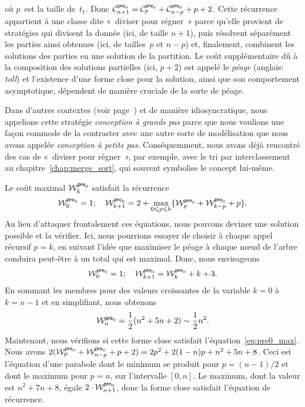 où \(p\)~est la taille de~\(t_1\). Donc \(\C{\fun{pre}_0}{n+1} =
\C{\fun{pre}_0}{p} + \C{\fun{pre}_0}{n-p} + p + 2\). Cette récurrence
appartient à une classe dite «~diviser pour
régner~» parce qu'elle provient de
stratégies qui divisent la donnée (ici, de taille \(n+1\)), puis
résolvent séparément les parties ainsi obtenues (ici, de tailles~\(p\)
et \(n-p\)) et, finalement, combinent les solutions des parties en une
solution de la partition. Le coût supplémentaire dû à la composition
des solutions partielles (ici, \(p+2\)) est appelé le
\emph{péage} (anglais: \emph{toll}) et l'existence d'une
forme close pour la solution, ainsi que son comportement asymptotique,
dépendent de manière cruciale de la sorte de péage.

Dans d'autres contextes (voir page~\pageref{big-step}) et de manière
idiosyncratique, nous appelions cette stratégie \emph{conception à
  grands pas} parce que nous voulions une
façon commode de la contraster avec une autre sorte de modélisation
que nous avons appelée \emph{conception à petits
  pas}. Conséquemment, nous avons déjà
rencontré des cas de «~diviser pour régner~», par exemple, avec le tri
par interclassement au
chapitre~\vref{chap:merge_sort}, qui souvent symbolise le concept
lui-même.

Le coût maximal
\(\W{\fun{pre}_0}{k}\) satisfait la
récurrence
\begin{equation}
\W{\fun{pre}_0}{0} = 1;\quad
\W{\fun{pre}_0}{k+1} =
  2 + \max_{0 \leqslant p \leqslant k}\{\W{\fun{pre}_0}{p}
                                  + \W{\fun{pre}_0}{k-p} + p\}.
\index{pre0@$\W{\fun{pre}_0}{n}$}
\label{eq:pre0_max}
\end{equation}
Au lieu d'attaquer frontalement ces équations, nous pouvons deviner
une solution possible et la vérifier. Ici, nous pourrions essayer de
choisir à chaque appel récursif \(p=k\), en suivant l'idée que
maximiser le péage à chaque nœud de l'arbre conduira peut-être à
un total qui est maximal. Donc, nous envisageons
\begin{equation}
\W{\fun{pre}_0}{0} = 1;\quad
\W{\fun{pre}_0}{k+1} = \W{\fun{pre}_0}{k} + k + 3.
\label{eq:max_pre0_rec}
\end{equation}
En sommant les membres pour des valeurs croissantes de la variable
\(k=0\) à \(k=n-1\) et en simplifiant, nous obtenons
\begin{equation*}
\W{\fun{pre}_0}{n} = \frac{1}{2}(n^2 + 5n + 2) \sim \frac{1}{2}n^2.
\end{equation*}
Maintenant, nous vérifions si cette forme close satisfait
l'équation~\eqref{eq:pre0_max}. Nous avons \(2(\W{\fun{pre}_0}{p} +
\W{\fun{pre}_0}{n-p} + p + 2) = 2p^2 + 2(1-n)p + n^2 + 5n + 8\). Ceci
est l'équation d'une parabole dont le minimum se produit pour \(p =
(n-1)/2\) et dont le maximum pour \(p = n\), sur l'intervalle
\([0,n]\). Le maximum, dont la valeur est \(n^2 + 7n + 8\), égale \(2
\cdot \W{\fun{pre}_0}{n+1}\), donc la forme close satisfait l'équation
de récurrence.

